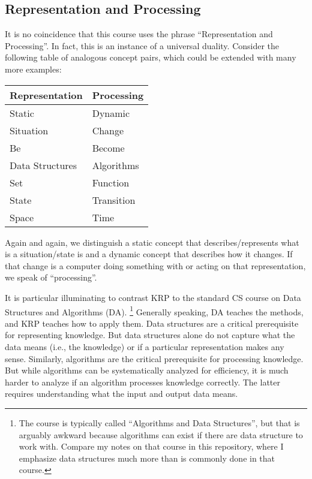 \subsection{Representation and Processing}

It is no coincidence that this course uses the phrase ``Representation and Processing''.
In fact, this is an instance of a universal duality.
Consider the following table of analogous concept pairs, which could be extended with many more examples:

\begin{center}
\begin{tabular}{l|l}
Representation & Processing \\
\hline
Static & Dynamic \\
Situation & Change \\
Be & Become \\
Data Structures & Algorithms \\
Set & Function \\
State & Transition \\
Space & Time
\end{tabular}
\end{center}

Again and again, we distinguish a static concept that describes/represents what is a situation/state is and a dynamic concept that describes how it changes.
If that change is a computer doing something with or acting on that representation, we speak of ``processing''.

It is particular illuminating to contrast KRP to the standard CS course on Data Structures and Algorithms (DA).%
\footnote{The course is typically called ``Algorithms and Data Structures'', but that is arguably awkward because algorithms can exist if there are data structure to work with. Compare my notes on that course in this repository, where I emphasize data structures much more than is commonly done in that course.}
Generally speaking, DA teaches the methods, and KRP teaches how to apply them.
Data structures are a critical prerequisite for representing knowledge.
But data structures alone do not capture what the data means (i.e., the knowledge) or if a particular representation makes any sense.
Similarly, algorithms are the critical prerequisite for processing knowledge.
But while algorithms can be systematically analyzed for efficiency, it is much harder to analyze if an algorithm processes knowledge correctly.
The latter requires understanding what the input and output data means.

